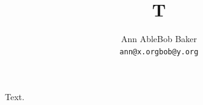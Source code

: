 \documentclass{article}
\begin{document}
\title{T}
\author{Ann Able\quad Bob Baker\\ \small \texttt{ann@x.org}\quad \texttt{bob@y.org}}
\maketitle
Text.
\end{document}
